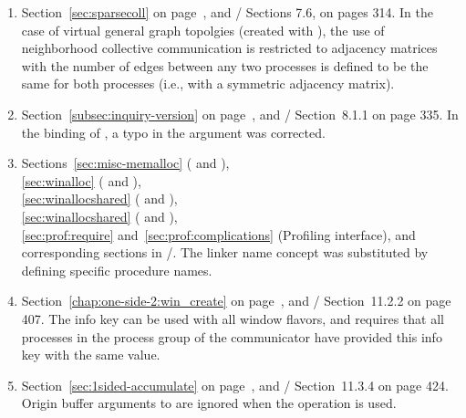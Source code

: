 \begin{enumerate}
\item 
Section~\ref{sec:sparsecoll} on page~\pageref{sec:sparsecoll}, and
\MPIIIIDOTO/ Sections 7.6, on pages 314.
\newline 
In the case of virtual general graph topolgies (created with ),
the use of neighborhood collective communication is restricted to adjacency matrices
with the number of edges between any two processes is defined to be the same for
both processes (i.e., with a symmetric adjacency matrix). 

\item 
Section~\ref{subsec:inquiry-version} on page~\pageref{subsec:inquiry-version}, and
\MPIIIIDOTO/ Section~8.1.1 on page 335.
\newline 
In the  binding of ,
a typo in the  argument was corrected.

\item 
{\raggedright
Sections~\ref{sec:misc-memalloc} ( and ),\\
\ref{sec:winalloc} ( and ),\\
\ref{sec:winallocshared} ( and ),\\
\ref{sec:winallocshared} ( and ),\\
\ref{sec:prof:require} and~\ref{sec:prof:complications} (Profiling interface), 
and corresponding sections in \MPIIIIDOTO/.
\newline 
The linker name concept was substituted by defining specific procedure names.

}
\item 
Section~\ref{chap:one-side-2:win_create} on page~\pageref{chap:one-side-2:win_create}, and
\MPIIIIDOTO/ Section~11.2.2 on page 407.
\newline 
The  info key can be used with all window flavors,
and requires that all processes in the process group of the communicator
have provided this info key with the same value.


\item 
Section~\ref{sec:1sided-accumulate} on page~\pageref{sec:1sided-accumulate}, and
\MPIIIIDOTO/ Section~11.3.4 on page 424.
\newline 
Origin buffer arguments to  are ignored when the  operation is used. 


\end{enumerate}

